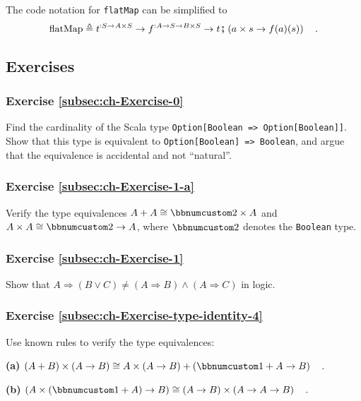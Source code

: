 The code notation for \lstinline!flatMap! can be simplified to
\[
\text{flatMap}\triangleq t^{:S\rightarrow A\times S}\rightarrow f^{:A\rightarrow S\rightarrow B\times S}\rightarrow t\bef\left(a\times s\rightarrow f(a)(s)\right)\quad.
\]


\subsection{Exercises}

\subsubsection{Exercise \label{subsec:ch-Exercise-0}\ref{subsec:ch-Exercise-0}}

Find the cardinality of the Scala type \lstinline!Option[Boolean => Option[Boolean]]!.
Show that this type is equivalent to \lstinline!Option[Boolean] => Boolean!,
and argue that the equivalence is accidental
and not ``natural''.

\subsubsection{Exercise \label{subsec:ch-Exercise-1-a}\ref{subsec:ch-Exercise-1-a}}

Verify the type equivalences $A+A\cong\bbnum 2\times A$ and $A\times A\cong\bbnum 2\rightarrow A$,
where $\bbnum 2$ denotes the \lstinline!Boolean! type.

\subsubsection{Exercise \label{subsec:ch-Exercise-1}\ref{subsec:ch-Exercise-1}}

Show that $A\Rightarrow(B\vee C)\neq(A\Rightarrow B)\wedge(A\Rightarrow C)$
in logic.

\subsubsection{Exercise \label{subsec:ch-Exercise-type-identity-4}\ref{subsec:ch-Exercise-type-identity-4}}

Use known rules to verify the type equivalences:

\textbf{(a)} $\left(A+B\right)\times\left(A\rightarrow B\right)\cong A\times\left(A\rightarrow B\right)+\left(\bbnum 1+A\rightarrow B\right)\quad.$

\textbf{(b)} $\left(A\times(\bbnum 1+A)\rightarrow B\right)\cong\left(A\rightarrow B\right)\times\left(A\rightarrow A\rightarrow B\right)\quad.$

